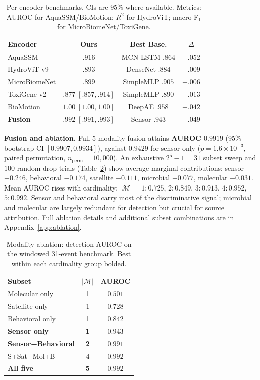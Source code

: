 \documentclass{article}
\begin{document}
\begin{table}[t]
\caption{Per-encoder benchmarks. CIs are $95\%$ where available. Metrics: AUROC for AquaSSM/BioMotion; $R^2$ for HydroViT; macro-F$_1$ for MicroBiomeNet/ToxiGene.}
\label{tab:encoders}
\centering
\small
\setlength{\tabcolsep}{3pt}
\begin{tabular}{lccc}
\toprule
\textbf{Encoder} & \textbf{Ours} & \textbf{Best Base.} & $\Delta$ \\
\midrule
AquaSSM & $.916$ & MCN-LSTM $.864$ & $+.052$ \\
HydroViT v9 & $.893$ & DenseNet $.884$ & $+.009$ \\
MicroBiomeNet & $.899$ & SimpleMLP $.905$ & $-.006$ \\
ToxiGene v2 & $.877\;[.857,.914]$ & SimpleMLP $.890$ & $-.013$ \\
BioMotion & $1.00\;[1.00,1.00]$ & DeepAE $.958$ & $+.042$ \\
\midrule
\textbf{Fusion} & $\mathbf{.992}\;[.991,.993]$ & Sensor $.943$ & $+.049$ \\
\bottomrule
\end{tabular}
\end{table}

\textbf{Fusion and ablation.}
Full 5-modality fusion attains \textbf{AUROC $0.9919$} (95\% bootstrap CI $[0.9907, 0.9934]$), against $0.9429$ for sensor-only ($p\!=\!1.6\!\times\!10^{-3}$, paired permutation, $n_\text{perm}\!=\!10{,}000$). An exhaustive $2^5\!-\!1\!=\!31$ subset sweep and $100$ random-drop trials (Table~\ref{tab:ablation_main}) show average marginal contributions: sensor $-0.246$, behavioral $-0.174$, satellite $-0.111$, microbial $-0.077$, molecular $-0.031$. Mean AUROC rises with cardinality: $|\mathcal{M}|\!=\!1\!:\!0.725$, $2\!:\!0.849$, $3\!:\!0.913$, $4\!:\!0.952$, $5\!:\!0.992$. Sensor and behavioral carry most of the discriminative signal; microbial and molecular are largely redundant for detection but crucial for source attribution. Full ablation details and additional subset combinations are in Appendix~\ref{app:ablation}.

\begin{table}[t]
\caption{Modality ablation: detection AUROC on the windowed 31-event benchmark. Best within each cardinality group bolded.}
\label{tab:ablation_main}
\centering
\small
\setlength{\tabcolsep}{4pt}
\begin{tabular}{lcc}
\toprule
\textbf{Subset} & $|\mathcal{M}|$ & \textbf{AUROC} \\
\midrule
Molecular only & 1 & $0.501$ \\
Satellite only & 1 & $0.728$ \\
Behavioral only & 1 & $0.842$ \\
\textbf{Sensor only} & \textbf{1} & $\mathbf{0.943}$ \\
\midrule
\textbf{Sensor+Behavioral} & \textbf{2} & $\mathbf{0.991}$ \\
S+Sat+Mol+B & 4 & $0.992$ \\
\textbf{All five} & \textbf{5} & $\mathbf{0.992}$ \\
\bottomrule
\end{tabular}
\end{table}
\end{document}
